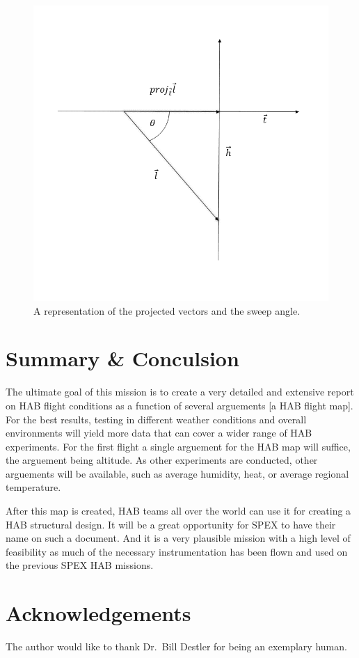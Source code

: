 \documentclass[journal]{SPEXformat}
\begin{document}
\begin{figure}
  \includegraphics[width = \linewidth]{figs/HAB-Pendulum-Projection.png}
  \caption{A representation of the projected vectors and the sweep angle.}
\label{fig: HAB Payload Pendulum Projection}
\end{figure}

\section{Summary \& Conculsion}
\label{sec:summary and conclusion}

  The ultimate goal of this mission is to create a very detailed and extensive report on HAB flight conditions
  as a function of several arguements [a HAB flight map]. For the best results, testing in different weather conditions and overall environments
  will yield more data that can cover a wider range of HAB experiments. For the first flight a single arguement for the HAB map
  will suffice, the arguement being altitude. As other experiments are conducted, other arguements will be available,
  such as average humidity, heat, or average regional temperature.

  After this map is created, HAB teams all over the world
  can use it for creating a HAB structural design. It will be a great opportunity for SPEX to have their name on such a document.
  And it is a very plausible mission with a high level of feasibility as much of the necessary instrumentation has been flown
  and used on the previous SPEX HAB missions.
\section*{Acknowledgements}
The author would like to thank Dr.~Bill Destler for being an exemplary human.

\onecolumn
\appendices{}
\end{document}
